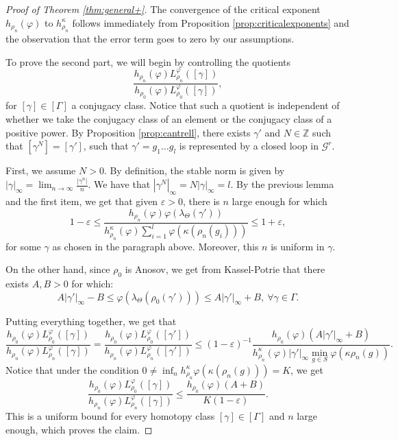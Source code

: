 \documentclass{amsart}
\newcommand{\ZZ}{\mathbb{Z}}
\theoremstyle{remark}
\theoremstyle{definition}
\begin{document}
\begin{proof}[Proof of Theorem \ref{thm:general+}]
The convergence of the critical exponent $h_{\rho_n} (\varphi)$ to $h_{\rho_n}^\kappa$ follows immediately from Proposition \ref{prop:criticalexponents} and the observation that the error term goes to zero by our assumptions.

To prove the second part, we will begin by controlling the quotients 
$$\frac{h_{\rho_n} (\varphi) L_{\rho_n}^\varphi ([\gamma])}{h_{\rho_0} (\varphi) L_{\rho_0}^\varphi ([\gamma])},$$
for $[\gamma] \in [\Gamma]$ a conjugacy class.
Notice that such a quotient is independent of whether we take the conjugacy class of an element or the conjugacy class of a positive power.
By Proposition \ref{prop:cantrell}, there exists $\gamma'$ and $N \in \ZZ$ such that $[\gamma^N] = [\gamma']$, such that $\gamma' = g_1 \ldots g_l$ is represented by a closed loop in $\mathcal{G}^r$. 

First, we assume $N > 0$.
By definition, the stable norm is given by $|\gamma|_\infty = \lim_{n \to \infty} \frac{|\gamma^n|}{n}$. We have that $|\gamma^N|_\infty = N|\gamma|_\infty = l.$
By the previous lemma and the first item, we get that given $\varepsilon >0$, there is $n$ large enough for which
$$1- \varepsilon \leq \frac{h_{\rho_n} (\varphi) \varphi (\lambda_\Theta (\gamma'))}{h_{\rho_n}^\kappa (\varphi) \sum^l_{i=1} \varphi (\kappa (\rho_n (g_i))) } \leq 1 + \varepsilon,$$
for some $\gamma$ as chosen in the paragraph above.
Moreover, this $n$ is uniform in $\gamma$.

On the other hand, since $\rho_0$ is Anosov, we get from Kassel-Potrie \cite{fanny2022} that there exists $A,B>0$ for which:
$$A |\gamma'|_\infty - B \leq \varphi (\lambda_\Theta (\rho_0 (\gamma'))) \leq A |\gamma'|_\infty + B,\: \forall \gamma \in \Gamma.$$

Putting everything together, we get that
$$\frac{h_{\rho_0} (\varphi) L_{\rho_0}^\varphi ([\gamma])}{h_{\rho_n} (\varphi) L_{\rho_n}^\varphi ([\gamma])} =  \frac{h_{\rho_0} (\varphi) L_{\rho_0}^\varphi ([\gamma'])}{h_{\rho_n} (\varphi) L_{\rho_n}^\varphi ([\gamma'])} \leq (1-\varepsilon)^{-1} \frac{h_{\rho_0} (\varphi) (A|\gamma'|_\infty + B)}{h_{\rho_n}^\kappa (\varphi) |\gamma'|_\infty \min_{g \in S} \varphi (\kappa \rho_n (g))}.$$
Notice that under the condition $0 \neq \inf_n h_{\rho_n}^\kappa \varphi (\kappa (\rho_n (g))) = K$, we get
$$\frac{h_{\rho_0} (\varphi) L_{\rho_0}^\varphi ([\gamma])}{h_{\rho_n} (\varphi) L_{\rho_n}^\varphi ([\gamma])} \leq \frac{h_{\rho_0} (\varphi) (A + B)}{K(1-\varepsilon)}.$$
This is a uniform bound for every homotopy class $[\gamma] \in [\Gamma]$ and $n$ large enough, which proves the claim.


\end{proof}
\end{document}
